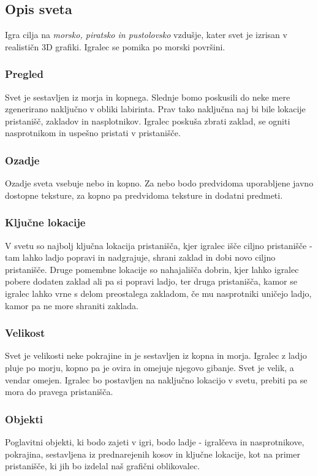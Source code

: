 \documentclass[a4paper]{article}
\begin{document}
\subsection{Opis sveta}
Igra cilja na \textit{morsko, piratsko in pustolovsko} vzdušje, kater svet je izrisan v realističn 3D grafiki. Igralec se pomika po morski površini.

\subsubsection{Pregled}
Svet je sestavljen iz morja in kopnega. Slednje bomo poskusili do neke mere zgenerirano naključno v obliki labirinta. Prav tako naključna naj bi bile lokacije pristanišč, zakladov in nasplotnikov. Igralec poskuša zbrati zaklad, se ogniti nasprotnikom in uspešno pristati v pristanišče.

\subsubsection{Ozadje}
Ozadje sveta vsebuje nebo in kopno. Za nebo bodo predvidoma uporabljene javno dostopne teksture, za kopno pa predvidoma teksture in dodatni predmeti.

\subsubsection{Ključne lokacije}
V svetu so najbolj ključna lokacija pristanišča, kjer igralec išče ciljno pristanišče - tam lahko ladjo popravi in nadgrajuje, shrani zaklad in dobi novo ciljno pristanišče. Druge pomembne lokacije so nahajališča dobrin, kjer lahko igralec pobere dodaten zaklad ali pa si popravi ladjo, ter druga pristanišča, kamor se igralec lahko vrne s delom preostalega zakladom, če mu nasprotniki uničejo ladjo, kamor pa ne more shraniti zaklada.

\subsubsection{Velikost}
Svet je velikosti neke pokrajine in je sestavljen iz kopna in morja. Igralec z ladjo pluje po morju, kopno pa je ovira in omejuje njegovo gibanje. Svet je velik, a vendar omejen. Igralec bo postavljen na naključno lokacijo v svetu, prebiti pa se mora do pravega pristanišča. 

\subsubsection{Objekti}
Poglavitni objekti, ki bodo zajeti v igri, bodo ladje - igralčeva in nasprotnikove, pokrajina, sestavljena iz prednarejenih kosov in ključne lokacije, kot na primer pristanišče, ki jih bo izdelal naš grafični oblikovalec.
\end{document}

